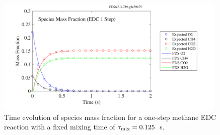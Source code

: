 \documentclass[11pt]{book}
\begin{document}
\begin{figure}[h!]
\begin{center}
\includegraphics[height=2.2in]{SCRIPT_FIGURES/reactionrate_EDC_flim_1step_CH4_spec}
\caption[Species evolution in a 1-step methane EDC reaction]{Time evolution of species mass fraction for a one-step methane EDC reaction with a fixed mixing time of $\tau_{\rm mix}=0.125$~s.}
\label{fig:EDC_1Step_meth_spec}
\end{center}
\end{figure}
\end{document}
